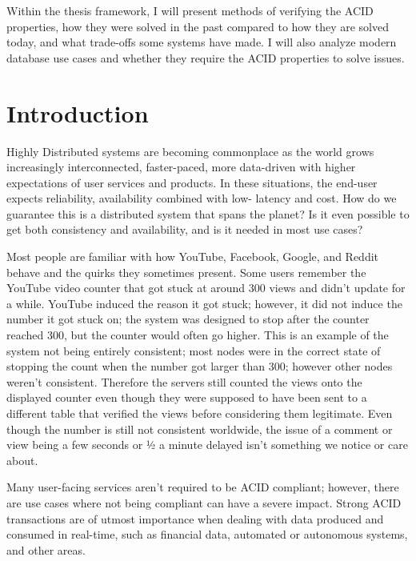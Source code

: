 \documentclass[a4paper,10pt,titlepage]{report}
\begin{document}
    Within the thesis framework, I will present methods of verifying the ACID properties, how they were solved in the past compared to how they are solved today, and what trade-offs some systems have made. I will also analyze modern database use cases and whether they require the ACID properties to solve issues.\\
    \vspace{5mm}



    \chapter{Introduction}
    Highly Distributed systems are becoming commonplace as the world grows increasingly interconnected, faster-paced, more data-driven with higher expectations of user services and products. In these situations, the end-user expects reliability, availability combined with low- latency and cost. How do we guarantee this is a distributed system that spans the planet? Is it even possible to get both consistency and availability, and is it needed in most use cases?\\
    \vspace{5mm}


    Most people are familiar with how YouTube, Facebook, Google, and Reddit behave and the quirks they sometimes present. Some users remember the YouTube video counter that got stuck at around 300 views and didn't update for a while. YouTube induced the reason it got stuck; however, it did not induce the number it got stuck on; the system was designed to stop after the counter reached 300, but the counter would often go higher. This is an example of the system not being entirely consistent; most nodes were in the correct state of stopping the count when the number got larger than 300; however other nodes weren't consistent. Therefore the servers still counted the views onto the displayed counter even though they were supposed to have been sent to a different table that verified the views before considering them legitimate. Even though the number is still not consistent worldwide, the issue of a comment or view being a few seconds or ½ a minute delayed isn't something we notice or care about.

    Many user-facing services aren't required to be ACID compliant; however, there are use cases where not being compliant can have a severe impact. Strong ACID transactions are of utmost importance when dealing with data produced and consumed in real-time, such as financial data, automated or autonomous systems, and other areas.
\end{document}
